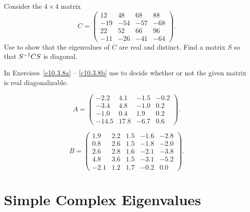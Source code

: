 \CEXER

\begin{exercise} \label{c10.3.7}
Consider the $4\times 4$ matrix
\begin{equation*}
C =\left(\begin{array}{rrrr}  12 & 48 & 68 & 88 \\ -19 & -54 & -57 & -68\\
22 & 52 & 66 & 96 \\ -11 & -26 & -41 & -64 \end{array}\right).
\end{equation*}
Use \Matlab to show that the eigenvalues of $C$ are real and distinct.
Find a matrix $S$ so that $S^{-1} CS$ is diagonal.  
\end{exercise}

\noindent In Exercises~\ref{c10.3.8a} -- \ref{c10.3.8b} use \Matlab 
to decide whether or not the given matrix is real diagonalizable.
\begin{exercise} \label{c10.3.8a}
\begin{equation*}
A=\left(
\begin{array}{rrrr}
      -2.2 & 4.1&-1.5&-0.2\\
      -3.4 & 4.8&-1.0& 0.2\\
      -1.0 & 0.4& 1.9& 0.2\\
     -14.5 &17.8&-6.7& 0.6
\end{array}
\right).
\end{equation*}
\end{exercise}
\begin{exercise} \label{c10.3.8b}
\begin{equation*}
B=\left(
\begin{array}{rrrrr}
      1.9 & 2.2 & 1.5 & -1.6 & -2.8\\
      0.8 & 2.6 & 1.5 & -1.8 & -2.0\\
      2.6 & 2.8 & 1.6 & -2.1 & -3.8\\
      4.8 & 3.6 & 1.5 & -3.1 & -5.2\\
     -2.1 & 1.2 & 1.7 & -0.2 &  0.0
\end{array} \right).
\end{equation*}
\end{exercise}



\section{Simple Complex Eigenvalues}  \label{S:CSE}

